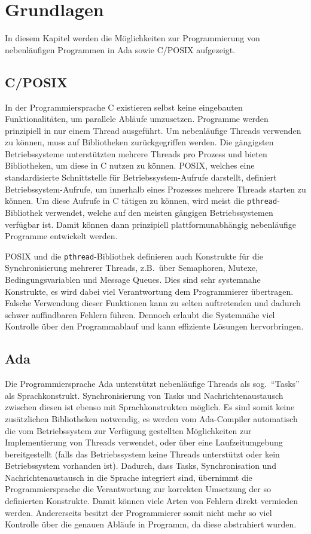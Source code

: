 \documentclass[oneside]{elaboration}
\begin{document}
\chapter{Grundlagen}
\label{chp:grundlagen}

In diesem Kapitel werden die Möglichkeiten zur Programmierung von nebenläufigen
Programmen in Ada sowie C/POSIX aufgezeigt.

\section{C/POSIX}
\label{sec:c/posix}

In der Programmiersprache C existieren selbst keine eingebauten
Funktionalitäten, um parallele Abläufe umzusetzen. Programme werden prinzipiell
in nur einem Thread ausgeführt. Um nebenläufige Threads verwenden zu können,
muss auf Bibliotheken zurückgegriffen werden. Die gängigsten Betriebssysteme
unterstützten mehrere Threads pro Prozess und bieten Bibliotheken, um diese in C
nutzen zu können. POSIX, welches eine standardisierte Schnittstelle für
Betriebssystem-Aufrufe darstellt, definiert Betriebssystem-Aufrufe, um innerhalb
eines Prozesses mehrere Threads starten zu können. Um diese Aufrufe in C tätigen
zu können, wird meist die \texttt{pthread}-Bibliothek verwendet, welche auf
den meisten gängigen Betriebssystemen verfügbar ist. Damit können dann prinzipiell
plattformunabhängig nebenläufige Programme entwickelt werden.

POSIX und die \texttt{pthread}-Bibliothek definieren auch Konstrukte für die
Synchronisierung mehrerer Threads, z.B.\ über Semaphoren, Mutexe,
Bedingungsvariablen und Message Queues. Dies sind sehr systemnahe Konstrukte, es
wird dabei viel Verantwortung dem Programmierer übertragen. Falsche Verwendung
dieser Funktionen kann zu selten auftretenden und dadurch schwer auffindbaren
Fehlern führen. Dennoch erlaubt die Systemnähe viel Kontrolle über den
Programmablauf und kann effiziente Lösungen hervorbringen.

\section{Ada}
\label{sec:ada}

Die Programmiersprache Ada unterstützt nebenläufige Threads als sog.\
\enquote{Tasks} als Sprachkonstrukt. Synchronisierung von Tasks und
Nachrichtenaustausch zwischen diesen ist ebenso mit Sprachkonstrukten möglich.
Es sind somit keine zusätzlichen Bibliotheken notwendig, es werden vom
Ada-Compiler automatisch die vom Betriebssystem zur Verfügung gestellten
Möglichkeiten zur Implementierung von Threads verwendet, oder über eine
Laufzeitumgebung bereitgestellt (falls das Betriebssystem keine Threads
unterstützt oder kein Betriebssystem vorhanden ist). Dadurch, dass Tasks,
Synchronisation und Nachrichtenaustausch in die Sprache integriert sind,
übernimmt die Programmiersprache die Verantwortung zur korrekten Umsetzung der
so definierten Konstrukte. Damit können viele Arten von Fehlern direkt vermieden
werden. Andererseits besitzt der Programmierer somit nicht mehr so viel
Kontrolle über die genauen Abläufe in Programm, da diese abstrahiert wurden.
\end{document}
